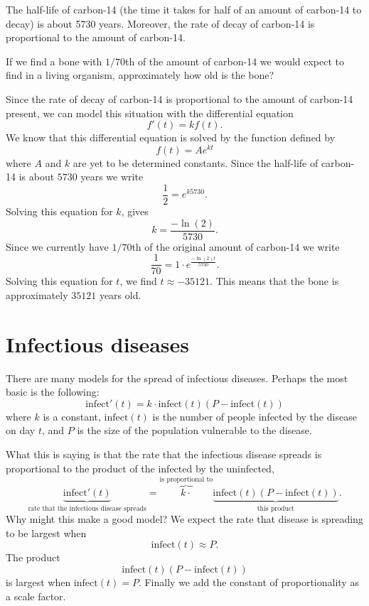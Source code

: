 \documentclass{ximera}
\begin{document}
\begin{example}
The half-life of carbon-14 (the time it takes for half of an amount of
carbon-14 to decay) is about 5730 years. Moreover, the rate of decay
of carbon-14 is proportional to the amount of carbon-14.

If we find a bone with $1/70$th of the amount of carbon-14 we would
expect to find in a living organism, approximately how old is the
bone?

\begin{explanation}
Since the rate of decay of carbon-14 is proportional to the amount of
carbon-14 present, we can model this situation with the differential
equation
\[
f'(t) = k f(t).
\]
We know that this differential equation is solved by the function
defined by
\[
f(t) = A e^{kt}
\]
where $A$ and $k$ are yet to be determined constants. Since the
half-life of carbon-14 is about $5730$ years we write
\[
\frac{1}{2} = e^{k 5730}.
\]
Solving this equation for $k$, gives
\[
k = \frac{-\ln(2)}{5730}.
\]
Since we currently have $1/70$th of the original amount of carbon-14
we write
\[
\frac{1}{70} = 1\cdot e^{\frac{-\ln(2)t}{5730}}.
\]
Solving this equation for $t$, we find $t \approx -35121$. This means
that the bone is approximately $35121$ years old.
\end{explanation}
\end{example}




\section{Infectious diseases}

There are many models for the spread of infectious diseases. Perhaps
the most basic is the following:
\[
\mathrm{infect}'(t) = k\cdot \mathrm{infect}(t)(P-\mathrm{infect}(t))
\]
where $k$ is a constant, $\mathrm{infect}(t)$ is the number of people
infected by the disease on day $t$, and $P$ is the size of the
population vulnerable to the disease.

What this is saying is that the rate that the infectious disease
spreads is proportional to the product of the infected by the
uninfected,
\[
\underbrace{\mathrm{infect}'(t)}_{\text{rate that the infectious disease
spreads}} = \overbrace{k\cdot}^{\text{is proportional to}} \underbrace{\mathrm{infect}(t)(P-\mathrm{infect}(t))}_{\text{this product}}.
\]
Why might this make a good model? We expect the rate that
disease is spreading to be largest when
\[
\mathrm{infect}(t) \approx P.
\]
The product
\[
\mathrm{infect}(t)(P-\mathrm{infect}(t))
\]
is largest when $\mathrm{infect}(t) = P$. Finally we add the constant
of proportionality as a scale factor.
\end{document}
